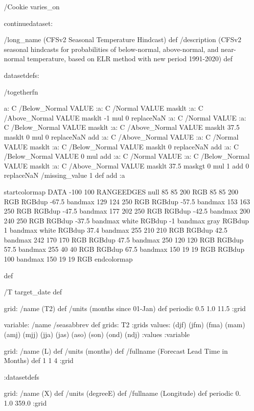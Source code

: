 \begin{ingrid}

/Cookie varies_on

continuedataset:

/long_name (CFSv2 Seasonal Temperature Hindcast) def
/description (CFSv2 seasonal hindcasts for probabilities of below-normal, above-normal, and near-normal temperature, based on ELR method with new period 1991-2020) def

datasetdefs:

/togetherfn {
 a:
    C /Below_Normal VALUE
    :a:
     C /Normal VALUE
     masklt
    :a:
     C /Above_Normal VALUE
     masklt
    -1 mul
    0 replaceNaN
    :a:
     C /Normal VALUE
     :a:
      C /Below_Normal VALUE
      masklt
     :a:
      C /Above_Normal VALUE
      masklt
     37.5 masklt
     0 mul
     0 replaceNaN           
     add
    :a:
     C /Above_Normal VALUE
     :a:
      C /Normal VALUE
      masklt
     :a:
      C /Below_Normal VALUE
      masklt
     0 replaceNaN
     add
 :a:
     C /Below_Normal VALUE
     0 mul
     add
    :a:
     C /Normal VALUE
     :a:
      C /Below_Normal VALUE
      masklt
     :a:
      C /Above_Normal VALUE        
      masklt
     37.5 maskgt
     0 mul
     1 add
     0 replaceNaN
     /missing_value 1 def
     add
    :a

startcolormap
DATA -100 100 RANGEEDGES
null 85 85 200 RGB
85 85 200 RGB RGBdup -67.5 bandmax
129 124 250 RGB RGBdup -57.5 bandmax
153 163 250 RGB RGBdup -47.5 bandmax
177 202 250 RGB RGBdup -42.5 bandmax
200 240 250 RGB RGBdup -37.5 bandmax
white RGBdup -1 bandmax
gray RGBdup 1 bandmax
white RGBdup 37.4 bandmax
255 210 210 RGB RGBdup 42.5 bandmax
242 170 170 RGB RGBdup 47.5 bandmax
250 120 120 RGB RGBdup 57.5 bandmax
255 40 40 RGB RGBdup 67.5 bandmax
150 19 19 RGB RGBdup 100 bandmax
150 19 19 RGB
endcolormap
} def 

/T {target_date} def

grid:
/name (T2) def
/units (months since 01-Jan) def
periodic
0.5 1.0 11.5
:grid

variable:
/name /seasabbrev def
grids: T2 :grids
values: (djf) (jfm) (fma) (mam) (amj) (mjj) (jja) (jas) (aso) (son) (ond) (ndj) :values
:variable

 grid:
 /name (L) def
 /units (months) def
 /fullname (Forecast Lead Time in Months) def
 1 1 4
 :grid

:datasetdefs

grid:
/name (X) def
/units (degreeE) def
/fullname (Longitude) def
periodic
0. 1.0 359.0
:grid


\end{ingrid}
